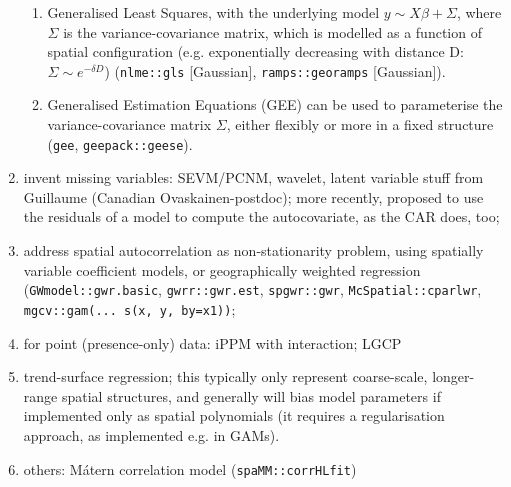 \documentclass[11pt]{article}
\begin{document}
\begin{enumerate}
\begin{enumerate}
	\item Generalised Least Squares, with the underlying model $y \sim X\beta + \Sigma$, where $\Sigma$ is the variance-covariance matrix, which is modelled as a function of spatial configuration (e.g. exponentially decreasing with distance D: $\Sigma \sim e^{-\delta D}$) (\texttt{nlme::gls} [Gaussian], \texttt{ramps::georamps} [Gaussian]).
	\item Generalised Estimation Equations (GEE) can be used to parameterise the variance-covariance matrix $\Sigma$, either flexibly or more in a fixed structure (\texttt{gee}, \texttt{geepack::geese}).
\end{enumerate} 
\item invent missing variables: SEVM/PCNM, wavelet, latent variable stuff from Guillaume (Canadian Ovaskainen-postdoc); more recently, \citet{Crase2013} proposed to use the residuals of a model to compute the autocovariate, as the CAR does, too; %
\item address spatial autocorrelation as non-stationarity problem, using spatially variable coefficient models, or geographically weighted regression (\texttt{GWmodel::gwr.basic}, \texttt{gwrr::gwr.est}, \texttt{spgwr::gwr}, \texttt{McSpatial::cparlwr}, \texttt{mgcv::gam(...  s(x, y, by=x1))};
\item for point (presence-only) data: iPPM with interaction; LGCP
\item trend-surface regression; this typically only represent coarse-scale, longer-range spatial structures, and generally will bias model parameters if implemented only as spatial polynomials (it requires a regularisation approach, as implemented e.g. in GAMs).
\item others: Mátern correlation model (\texttt{spaMM::corrHLfit})
\end{enumerate}
\end{document}
